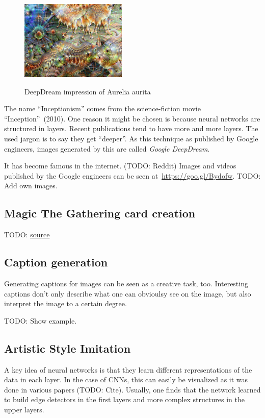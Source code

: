 \begin{figure}[ht]
    \centering
    \includegraphics[width=0.45\textwidth]{figures/DeepDream/Aurelia-aurita-3/0099.jpg}
        \label{fig:Aurelia-aurita-3-100}
    \caption{DeepDream impression of Aurelia aurita}
\end{figure}

The name \enquote{Inceptionism} comes from the science-fiction movie
\enquote{Inception}~(2010). One reason it might be chosen is because neural
networks are structured in layers. Recent publications tend to have more and
more layers. The used jargon is to say they get \enquote{deeper}. As this
technique as published by Google engineers, images generated by this are called
\textit{Google DeepDream}.

It has become famous in the internet. (TODO: Reddit)
Images and videos published by the Google engineers can be seen
at~\href{https://goo.gl/Bydofw}{https://goo.gl/Bydofw}. TODO: Add own images.


\subsection{Magic The Gathering card creation}

TODO: \href{http://nerdist.com/what-happens-when-artificial-intelligence-makes-magic-the-gathering-cards/}{source}


\subsection{Caption generation}
Generating captions for images can be seen as a creative task, too. Interesting
captions don't only describe what one can obvioulsy see on the image, but also
interpret the image to a certain degree.

TODO: Show example.


\subsection{Artistic Style Imitation}
A key idea of neural networks is that they learn different representations of
the data in each layer. In the case of \glspl{CNN}, this can easily be
visualized as it was done in various papers (TODO: Cite). Usually, one finds
that the network learned to build edge detectors in the first layers and more
complex structures in the upper layers.

